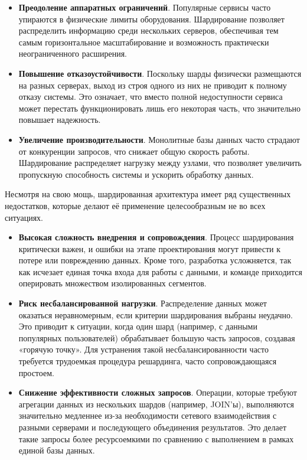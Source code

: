\begin{itemize}
    \item \textbf{Преодоление аппаратных ограничений}. Популярные сервисы часто
    упираются в физические лимиты оборудования. Шардирование позволяет
    распределить информацию среди нескольких серверов, обеспечивая тем самым
    горизонтальное масштабирование и возможность практически неограниченного
    расширения.

    \item \textbf{Повышение отказоустойчивости}. Поскольку шарды физически
    размещаются на разных серверах, выход из строя одного из них не приводит к
    полному отказу системы. Это означает, что вместо полной недоступности
    сервиса может перестать функционировать лишь его некоторая часть, что
    значительно повышает надежность.

    \item \textbf{Увеличение производительности}. Монолитные базы данных часто
    страдают от конкуренции запросов, что снижает общую скорость работы.
    Шардирование распределяет нагрузку между узлами, что позволяет увеличить
    пропускную способность системы и ускорить обработку данных.
\end{itemize}

Несмотря на свою мощь, шардированная архитектура имеет ряд существенных
недостатков, которые делают её применение целесообразным не во всех ситуациях.

\begin{itemize}
    \item \textbf{Высокая сложность внедрения и сопровождения}. Процесс
    шардирования критически важен, и ошибки на этапе проектирования могут
    привести к потере или повреждению данных. Кроме того, разработка
    усложняется, так как исчезает единая точка входа для работы с данными, и
    команде приходится оперировать множеством изолированных сегментов.

    \item \textbf{Риск несбалансированной нагрузки}. Распределение данных может
    оказаться неравномерным, если критерии шардирования выбраны неудачно.
    Это приводит к ситуации, когда один шард (например, с данными популярных
    пользователей) обрабатывает большую часть запросов, создавая «горячую
    точку». Для устранения такой несбалансированности часто требуется
    трудоемкая процедура решардинга, часто сопровождающаяся простоем.

    \item \textbf{Снижение эффективности сложных запросов}. Операции, которые
    требуют агрегации данных из нескольких шардов (например, JOIN'ы),
    выполняются значительно медленнее из-за необходимости сетевого
    взаимодействия с разными серверами и последующего объединения результатов.
    Это делает такие запросы более ресурсоемкими по сравнению с выполнением в
    рамках единой базы данных.
\end{itemize}

